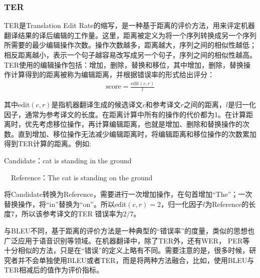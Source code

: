 
\subsubsection{TER}

\parinterval  TER是Translation Edit Rate的缩写，是一种基于距离的评价方法，用来评定机器翻译结果的译后编辑的工作量\cite{snover2006study}。这里，距离被定义为将一个序列转换成另一个序列所需要的最少编辑操作次数。操作次数越多，距离越大，序列之间的相似性越低；相反距离越小，表示一个句子越容易改写成另一个句子，序列之间的相似性越高。TER使用的编辑操作包括：增加，删除，替换和移位，其中增加，删除，替换操作计算得到的距离被称为编辑距离，并根据错误率的形式给出评分：
\begin{eqnarray}
\textrm{score}=\frac{\textrm{edit}(c,r)}{l}
\label{eq:1-5}
\end{eqnarray}

\noindent 其中$\textrm{edit}(c,r)$是指机器翻译生成的候选译文$c$和参考译文$r$之间的距离，$l$是归一化因子，通常为参考译文的长度。在距离计算中所有的操作的代价都为1。在计算距离时，优先考虑移位操作，再计算编辑距离，也就是增加、删除和替换操作的次数。直到增加、移位操作无法减少编辑距离时，将编辑距离和移位操作的次数累加得到TER计算的距离。例如:

\begin{example}
Candidate：cat is standing in the ground

\qquad \qquad \ \  Reference：The cat is standing on the ground
\label{eg:1-2}
\end{example}

\parinterval 将Candidate转换为Reference，需要进行一次增加操作，在句首增加``The''；一次替换操作，将``in''替换为``on''。所以$\textrm{edit}(c,r) = 2$，归一化因子$l$为Reference的长度7，所以该参考译文的TER 错误率为$2/7$。

\parinterval 与BLEU不同，基于距离的评价方法是一种典型的``错误率''的度量，类似的思想也广泛应用于语音识别等领域。在机器翻译中，除了TER外，还有WER， PER等十分相似的方法，只是在``错误''的定义上略有不同。需要注意的是，很多时候，研究者并不会单独使用BLEU或者TER，而是将两种方法融合，比如，使用BLEU与TER相减后的值作为评价指标。


